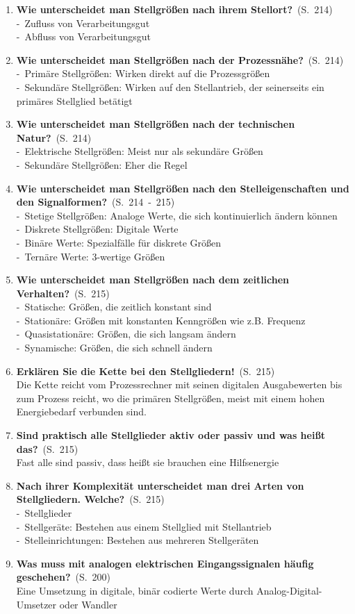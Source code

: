 \documentclass[a4paper,12pt]{article}
\newcommand{\question}[3]{\pagebreak[3]\item {\textbf{#1?}}\ (S.\ #2)#3}
\newcommand{\statement}[3]{\pagebreak[3]\item {\textbf{#1!}}\ (S.\ #2)#3}
\newcommand{\catchword}[1]{\\-\ #1}
\newcommand{\normaltext}[1]{\\#1}
\newcommand{\page}[1]{#1}
\newcommand{\pages}[2]{#1\ -\ #2}
\begin{document}
\begin{enumerate}
  \question{Wie unterscheidet man Stellgrößen nach ihrem Stellort}{\page{214}}
  {
    \catchword{Zufluss von Verarbeitungsgut}
    \catchword{Abfluss von Verarbeitungsgut}
  }

  \question{Wie unterscheidet man Stellgrößen nach der Prozessnähe}{\page{214}}
  {
    \catchword{Primäre Stellgrößen: Wirken direkt auf die Prozessgrößen}
    \catchword{Sekundäre Stellgrößen: Wirken auf den Stellantrieb, der seinerseits
              ein primäres Stellglied betätigt}
  }

  \question{Wie unterscheidet man Stellgrößen nach der technischen Natur}{\page{214}}
  {
    \catchword{Elektrische Stellgrößen: Meist nur als sekundäre Größen}
    \catchword{Sekundäre Stellgrößen: Eher die Regel}
  }

  \question{Wie unterscheidet man Stellgrößen nach den Stelleigenschaften
            und den Signalformen}{\pages{214}{215}}
  {
    \catchword{Stetige Stellgrößen: Analoge Werte, die sich kontinuierlich ändern können}
    \catchword{Diskrete Stellgrößen: Digitale Werte}
    \catchword{Binäre Werte: Spezialfälle für diskrete Größen}
    \catchword{Ternäre Werte: 3-wertige Größen}
  }

  \question{Wie unterscheidet man Stellgrößen nach dem zeitlichen Verhalten}{\page{215}}
  {
    \catchword{Statische: Größen, die zeitlich konstant sind}
    \catchword{Stationäre: Größen mit konstanten Kenngrößen wie z.B. Frequenz}
    \catchword{Quasistationäre: Größen, die sich langsam ändern}
    \catchword{Synamische: Größen, die sich schnell ändern}
  }

  \statement{Erklären Sie die Kette bei den Stellgliedern}{\page{215}}
  {
    \normaltext{Die Kette reicht vom Prozessrechner mit seinen digitalen Ausgabewerten
                bis zum Prozess reicht, wo die primären Stellgrößen, meist mit einem hohen
                Energiebedarf verbunden sind.}
  }

  \question{Sind praktisch alle Stellglieder aktiv oder passiv und was heißt das}{\page{215}}
  {
    \normaltext{Fast alle sind passiv, dass heißt sie brauchen eine Hilfsenergie}
  }

  \question{Nach ihrer Komplexität unterscheidet man drei Arten von Stellgliedern. Welche}{\page{215}}
  {
    \catchword{Stellglieder}
    \catchword{Stellgeräte: Bestehen aus einem Stellglied mit Stellantrieb}
    \catchword{Stelleinrichtungen: Bestehen aus mehreren Stellgeräten}
  }

  \question{Was muss mit analogen elektrischen Eingangssignalen häufig geschehen}{\page{200}}
  {
    \normaltext{Eine Umsetzung in digitale, binär codierte Werte durch Analog-Digital-Umsetzer
                oder Wandler}
  }


\end{enumerate}
\end{document}
